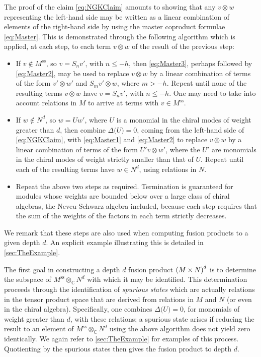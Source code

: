 \documentclass[a4paper,reqno,12pt]{report}
\theoremstyle{definition}
\numberwithin{equation}{section}
\let\originalleft\left     %
\let\originalright\right
\renewcommand{\left}{\mathopen{}\mathclose\bgroup\originalleft}
\renewcommand{\right}{\aftergroup\egroup\originalright}
\newcommand{\brac}[1]{\left( #1 \right)}
\newcommand{\CC}{\mathbb{C}}
\newcommand{\spsub}[1]{#1^{\text{ss}}}       %
\newcommand{\fuse}{\mathbin{\times}}                                            %
\newcommand{\coproductsymb}{\Delta}                                                %
\newcommand{\coproduct}[1]{\coproductsymb \bigl( #1 \bigr)}                        %
\newcommand{\lhs}{left-hand side}
\newcommand{\rhs}{right-hand side}
\newcommand{\ns}{Neveu-Schwarz}
\theoremstyle{plain}
\begin{document}
The proof of the claim \eqref{eq:NGKClaim} amounts to showing that any $v \otimes w$ representing the \lhs{} may be written as a linear combination of elements of the \rhs{} by using the master coproduct formulae \eqref{eq:Master}.  This is demonstrated through the following algorithm which is applied, at each step, to each term $v \otimes w$ of the result of the previous step:
\begin{itemize}
\item If $v \notin \spsub{M}$, so $v = S_n v'$, with $n \leq -h$, then \eqref{eq:Master3}, perhaps followed by \eqref{eq:Master2}, may be used to replace $v \otimes w$ by a linear combination of terms of the form $v' \otimes w'$ and $S_m v' \otimes w$, where $m > -h$.  Repeat until none of the resulting terms $v \otimes w$ have $v = S_n v'$, with $n \leq -h$.  One may need to take into account relations in $M$ to arrive at terms with $v \in \spsub{M}$.
\item If $w \notin N^d$, so $w = U w'$, where $U$ is a monomial in the chiral modes of weight greater than $d$, then combine $\coproduct{U} = 0$, coming from the \lhs{} of \eqref{eq:NGKClaim}, with \eqref{eq:Master1} and \eqref{eq:Master2} to replace $v \otimes w$ by a linear combination of terms of the form $U' v \otimes w'$, where the $U'$ are monomials in the chiral modes of weight strictly smaller than that of $U$.  Repeat until each of the resulting terms have $w \in N^d$, using relations in $N$.
\item Repeat the above two steps as required.  Termination is guaranteed for modules whose weights are bounded below over a large class of chiral algebras, the \ns{} algebra included, because each step requires that the sum of the weights of the factors in each term strictly decreases.
\end{itemize}
We remark that these steps are also used when computing fusion products to a given depth $d$.  An explicit example illustrating this is detailed in \cref{sec:TheExample}.

The first goal in constructing a depth $d$ fusion product $\brac{M \fuse N}^d$ is to determine the subspace of $\spsub{M} \otimes_{\CC} N^d$ with which it may be identified.  This determination proceeds through the identification of \emph{spurious states} which are actually relations in the tensor product space that are derived from relations in $M$ and $N$ (or even in the chiral algebra).  Specifically, one combines $\coproduct{U} = 0$, for monomials of weight greater than $d$, with these relations; a spurious state arises if reducing the result to an element of $\spsub{M} \otimes_{\CC} N^d$ using the above algorithm does not yield zero identically.  We again refer to \cref{sec:TheExample} for examples of this process.  Quotienting by the spurious states then gives the fusion product to depth $d$.
\end{document}
